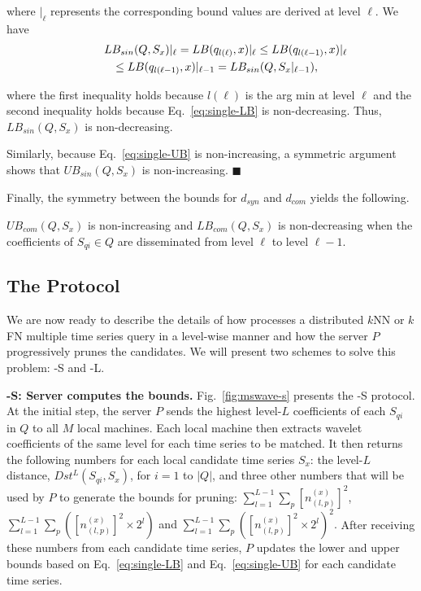 \noindent
where $|_{\ell}$ represents the corresponding bound values are 
derived at level $\ell$. We have
{\small
\begin{eqnarray*}
\lefteqn{LB_{sin}(Q,S_x)|_\ell = LB(q_{l(\ell)},x)|_\ell 
 \leq LB(q_{l(\ell-1)},x)|_\ell} \\
 &&\leq LB(q_{l(\ell-1)},x)|_{\ell-1} = LB_{sin}(Q,S_x|_{\ell-1}),
\end{eqnarray*}}

\noindent
where the first inequality holds because $l(\ell)$ is the arg min at
level $\ell$ and the second inequality holds because
Eq.~\eqref{eq:single-LB} is non-decreasing.  Thus, $LB_{sin}(Q,S_x)$ is
non-decreasing.

Similarly, because Eq.~\eqref{eq:single-UB} is non-increasing, a symmetric
argument shows that $UB_{sin}(Q,S_x)$ is non-increasing.
\hfill $\blacksquare$

Finally, the symmetry between the bounds for $d_{syn}$ and $d_{com}$
yields the following.
\begin{theorem}
\label{theo:com-bound-shrink}
$UB_{com}(Q, S_x)$ is non-increasing and $LB_{com}(Q, S_x)$ is
non-decreasing when the coefficients of $S_{qi} \in Q$ are
disseminated from level $\ell$ to level $\ell-1$.
\end{theorem}

\vspace{-0.1in}
\subsection{The \MSWave{} Protocol}\label{subsec:protocol}

We are now ready to describe the details of how \MSWave{} processes a
distributed $k$NN or $k$FN multiple time series query in a level-wise
manner and how the server $P$ progressively prunes the candidates. 
We will present two schemes to solve this problem: \MSWave-S{} and \MSWave-L{}. 

\textbf{\MSWave-S{}: Server computes the bounds.}
Fig.~\ref{fig:mswave-s} presents the \MSWave-S{} protocol. At the
initial step, the server $P$ sends the highest level-$L$ coefficients
of each $S_{qi}$ in $Q$ to all $M$ local machines. Each local machine
then extracts wavelet coefficients of the same level for each time
series to be matched.  It then returns the following numbers for each
local candidate time series $S_x$: the level-$L$ distance,
$Dst^{L}(S_{qi}, S_x)$, for $i=1$ to $|Q|$, and three other numbers that
will be used by $P$ to generate the bounds for pruning:
{\small
$\sum_{l=1}^{L-1}\sum_{p}[n_{(l,p)}^{(x)}]^2$,
$\sum_{l=1}^{L-1}\sum_{p}([n_{(l,p)}^{(x)}]^2 \times 2^{l})$
\textrm{and}
$\sum_{l=1}^{L-1}\sum_{p}([n_{(l,p)}^{(x)}]^2 \times 2^{l})^2$.
}
%
After receiving these numbers from each candidate time series, $P$
updates the lower and upper bounds based on Eq.~\eqref{eq:single-LB}
and Eq.~\eqref{eq:single-UB} for each candidate time series.

